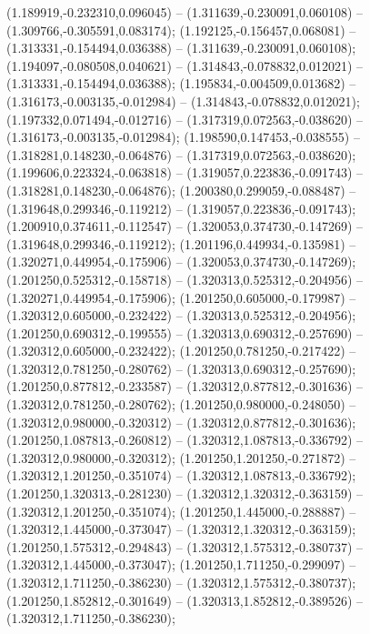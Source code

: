  (1.189919,-0.232310,0.096045) -- (1.311639,-0.230091,0.060108) -- (1.309766,-0.305591,0.083174);
 (1.192125,-0.156457,0.068081) -- (1.313331,-0.154494,0.036388) -- (1.311639,-0.230091,0.060108);
 (1.194097,-0.080508,0.040621) -- (1.314843,-0.078832,0.012021) -- (1.313331,-0.154494,0.036388);
 (1.195834,-0.004509,0.013682) -- (1.316173,-0.003135,-0.012984) -- (1.314843,-0.078832,0.012021);
 (1.197332,0.071494,-0.012716) -- (1.317319,0.072563,-0.038620) -- (1.316173,-0.003135,-0.012984);
 (1.198590,0.147453,-0.038555) -- (1.318281,0.148230,-0.064876) -- (1.317319,0.072563,-0.038620);
 (1.199606,0.223324,-0.063818) -- (1.319057,0.223836,-0.091743) -- (1.318281,0.148230,-0.064876);
 (1.200380,0.299059,-0.088487) -- (1.319648,0.299346,-0.119212) -- (1.319057,0.223836,-0.091743);
 (1.200910,0.374611,-0.112547) -- (1.320053,0.374730,-0.147269) -- (1.319648,0.299346,-0.119212);
 (1.201196,0.449934,-0.135981) -- (1.320271,0.449954,-0.175906) -- (1.320053,0.374730,-0.147269);
 (1.201250,0.525312,-0.158718) -- (1.320313,0.525312,-0.204956) -- (1.320271,0.449954,-0.175906);
 (1.201250,0.605000,-0.179987) -- (1.320312,0.605000,-0.232422) -- (1.320313,0.525312,-0.204956);
 (1.201250,0.690312,-0.199555) -- (1.320313,0.690312,-0.257690) -- (1.320312,0.605000,-0.232422);
 (1.201250,0.781250,-0.217422) -- (1.320312,0.781250,-0.280762) -- (1.320313,0.690312,-0.257690);
 (1.201250,0.877812,-0.233587) -- (1.320312,0.877812,-0.301636) -- (1.320312,0.781250,-0.280762);
 (1.201250,0.980000,-0.248050) -- (1.320312,0.980000,-0.320312) -- (1.320312,0.877812,-0.301636);
 (1.201250,1.087813,-0.260812) -- (1.320312,1.087813,-0.336792) -- (1.320312,0.980000,-0.320312);
 (1.201250,1.201250,-0.271872) -- (1.320312,1.201250,-0.351074) -- (1.320312,1.087813,-0.336792);
 (1.201250,1.320313,-0.281230) -- (1.320312,1.320312,-0.363159) -- (1.320312,1.201250,-0.351074);
 (1.201250,1.445000,-0.288887) -- (1.320312,1.445000,-0.373047) -- (1.320312,1.320312,-0.363159);
 (1.201250,1.575312,-0.294843) -- (1.320312,1.575312,-0.380737) -- (1.320312,1.445000,-0.373047);
 (1.201250,1.711250,-0.299097) -- (1.320312,1.711250,-0.386230) -- (1.320312,1.575312,-0.380737);
 (1.201250,1.852812,-0.301649) -- (1.320313,1.852812,-0.389526) -- (1.320312,1.711250,-0.386230);

